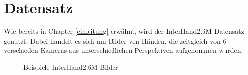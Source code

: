 \chapter{Datensatz}

Wie bereits in Chapter \ref{einleitung} erwähnt, wird der InterHand2.6M Datensatz \cite{InterHand} genutzt.
Dabei handelt es sich um Bilder von Händen, die zeitgleich von 6 verschieden Kameras aus unterschiedlichen Perspektiven aufgenommen wurden. \\
\begin{figure}[!htb]
    \centering
    \caption{Beispiele InterHand2.6M Bilder\cite{InterHand}}
    \label{fig:interhand}
\end{figure} 

